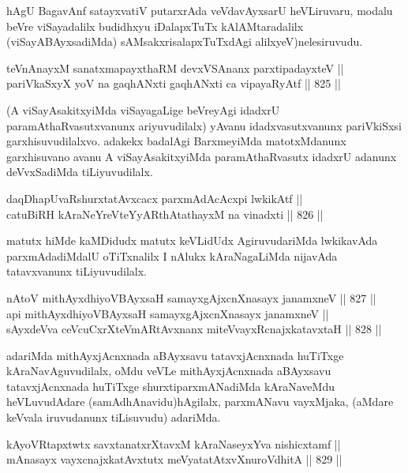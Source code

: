 \begin{artha}
hAgU BagavAnf satayxvatiV putarxrAda veVdavAyxsarU heVLiruvaru, modalu beVre viSayadalilx budidhxyu iDalapxTuTx kAlAMtaradalilx (viSayABAyxsadiMda) sAMsakxrisalapxTuTxdAgi alilxyeV)nelesiruvudu.
\end{artha}

\begin{shl}
teVnAnayxM sanatxmapayxthaRM devxVSAnanx parxtipadayxteV || \\
pariVkaSxyX yoV na gaqhANxti gaqhANxti ca vipayaRyAtf \hfill || 825 ||  
\end{shl}

\begin{artha}
(A viSayAsakitxyiMda viSayagaLige beVreyAgi idadxrU paramAthaRvasutxvanunx ariyuvudilalx) yAvanu idadxvasutxvanunx pariVkiSxsi garxhisuvudilalxvo. adakekx badalAgi BarxmeyiMda matotxMdanunx garxhisuvano avanu A viSayAsakitxyiMda paramAthaRvasutx idadxrU adanunx deVvxSadiMda tiLiyuvudilalx.
\end{artha}

\begin{shl}
daqDhapUvaRshurxtatAvxcacx parxmAdAcAcxpi lwkikAtf || \\
catuBiRH kAraNeYreVteYyARthAtathayxM na vinadxti \hfill || 826 ||  
\end{shl}

\begin{artha}
matutx hiMde kaMDidudx matutx keVLidUdx AgiruvudariMda lwkikavAda parxmAdadiMdalU oTiTxnalilx I nAlukx kAraNagaLiMda nijavAda tatavxvanunx tiLiyuvudilalx.
\end{artha}

\begin{shl}
nAtoV mithAyxdhiyoV\s BAyxsaH samayxgAjxcnXnasayx janamxneV \hfill || 827 ||  \\
api mithAyxdhiyoV\s BAyxsaH samayxgAjxcnXnasayx janamxneV || \\
sAyxdeVva ceVcuCxrXteVmARtAvxnanx miteVvayxRcnajxkatavxtaH \hfill || 828 ||  
\end{shl}

\begin{artha}
adariMda mithAyxjAcnxnada aBAyxsavu tatavxjAcnxnada huTiTxge kAraNavAguvudilalx, oMdu veVLe mithAyxjAcnxnada aBAyxsavu tatavxjAcnxnada huTiTxge shurxtiparxmANadiMda kAraNaveMdu heVLuvudAdare (samAdhAnavidu)\ndash  hAgilalx, parxmANavu vayxMjaka, (aMdare keVvala iruvudanunx tiLisuvudu) adariMda.
\end{artha}

\begin{shl}
kAyoVRtapxtwtx savxtanatxrXtavxM kAraNaseyxYva nishicxtamf || \\
mAnasayx vayxcnajxkatAvxtutx meVyatatAtxvXnuroVdhitA \hfill || 829 ||  
\end{shl}

